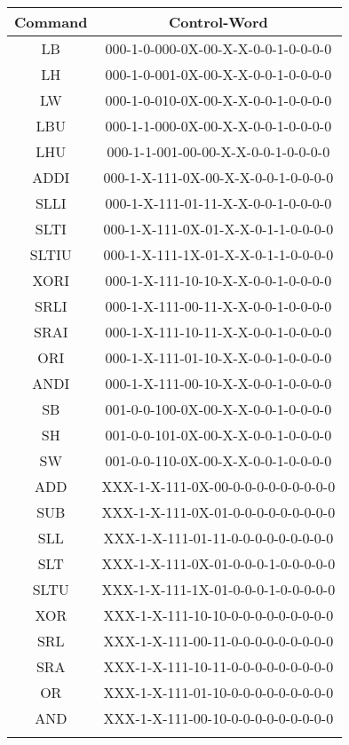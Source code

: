 	\clearpage
		
	\begin{center}
		\begin{threeparttable}[!ht]
			\begin{tabular}{|c|c|} \hline
				
				\setrow{\bfseries}Command &\setrow{\bfseries} Control-Word \\\hline
				LB   &000-1-0-000-0X-00-X-X-0-0-1-0-0-0-0 \\\hline
				LH   &000-1-0-001-0X-00-X-X-0-0-1-0-0-0-0\\\hline
				LW   &000-1-0-010-0X-00-X-X-0-0-1-0-0-0-0\\\hline
				LBU  &000-1-1-000-0X-00-X-X-0-0-1-0-0-0-0\\\hline
				LHU  &000-1-1-001-00-00-X-X-0-0-1-0-0-0-0\\\Xhline{5\arrayrulewidth}
				
				ADDI &000-1-X-111-0X-00-X-X-0-0-1-0-0-0-0\\\hline
				SLLI &000-1-X-111-01-11-X-X-0-0-1-0-0-0-0\\\hline
				SLTI &000-1-X-111-0X-01-X-X-0-1-1-0-0-0-0\\\hline 
				SLTIU&000-1-X-111-1X-01-X-X-0-1-1-0-0-0-0\\\hline 
				XORI &000-1-X-111-10-10-X-X-0-0-1-0-0-0-0\\\hline 
				SRLI &000-1-X-111-00-11-X-X-0-0-1-0-0-0-0\\\hline
				SRAI &000-1-X-111-10-11-X-X-0-0-1-0-0-0-0\\\hline
				ORI  &000-1-X-111-01-10-X-X-0-0-1-0-0-0-0\\\hline
				ANDI &000-1-X-111-00-10-X-X-0-0-1-0-0-0-0\\\Xhline{5\arrayrulewidth}
				
				SB &001-0-0-100-0X-00-X-X-0-0-1-0-0-0-0\\\hline
				SH &001-0-0-101-0X-00-X-X-0-0-1-0-0-0-0\\\hline
				SW &001-0-0-110-0X-00-X-X-0-0-1-0-0-0-0\\\Xhline{5\arrayrulewidth}
				
				ADD &XXX-1-X-111-0X-00-0-0-0-0-0-0-0-0-0\\\hline
				SUB &XXX-1-X-111-0X-01-0-0-0-0-0-0-0-0-0\\\hline
				SLL &XXX-1-X-111-01-11-0-0-0-0-0-0-0-0-0\\\hline
				SLT &XXX-1-X-111-0X-01-0-0-0-1-0-0-0-0-0\\\hline
				SLTU&XXX-1-X-111-1X-01-0-0-0-1-0-0-0-0-0\\\hline
				XOR &XXX-1-X-111-10-10-0-0-0-0-0-0-0-0-0\\\hline
				SRL &XXX-1-X-111-00-11-0-0-0-0-0-0-0-0-0\\\hline
				SRA &XXX-1-X-111-10-11-0-0-0-0-0-0-0-0-0\\\hline
				OR  &XXX-1-X-111-01-10-0-0-0-0-0-0-0-0-0\\\hline
				AND &XXX-1-X-111-00-10-0-0-0-0-0-0-0-0-0\\\Xhline{5\arrayrulewidth}
				

\end{tabular}
\end{threeparttable}
\end{center}
